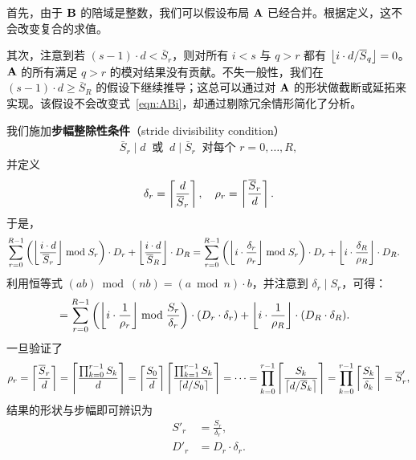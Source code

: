 首先，由于 $\mathbf{B}$ 的陪域是整数，我们可以假设布局 $\mathbf{A}$ 已经合并。根据定义，这不会改变复合的求值。

其次，注意到若 $(s-1) \cdot d < \bar{S}_r$，则对所有 $i < s$ 与 $q > r$ 都有 $\left\lfloor {i \cdot d / \overline{S}_q} \right\rfloor = 0$。$\mathbf{A}$ 的所有满足 $q > r$ 的模对结果没有贡献。不失一般性，我们在 $(s-1) \cdot d \geq \bar{S}_R$ 的假设下继续推导；这总可以通过对 $\mathbf{A}$ 的形状做截断或延拓来实现。该假设不会改变式~\eqref{eqn:ABi}，却通过剔除冗余情形简化了分析。

我们施加{\bf 步幅整除性条件}（stride divisibility condition）
\begin{align}
\bar{S}_r \mid d \ \text{ 或 } \ d \mid \bar{S}_r \ \text{ 对每个 } r = 0, \ldots, R,
\label{eqn:divis_stride}
\end{align}
并定义
\begin{align*}
\delta_r = \left\lceil {\frac{d}{\overline{S}_r}} \right\rceil, \quad \rho_r = \left\lceil {\frac{\overline{S}_r}{d}} \right\rceil.
\end{align*}
于是，
\begin{align*}
\sum_{r=0}^{R-1} \left(\left\lfloor {\frac{i \cdot d}{\overline{S}_r}} \right\rfloor \bmod S_r\right) \cdot D_r + \left\lfloor {\frac{i \cdot d}{\overline{S}_R}} \right\rfloor \cdot D_R &=
\sum_{r=0}^{R-1} \left(\left\lfloor {i \cdot \frac{\delta_r}{\rho_r}} \right\rfloor \bmod S_r\right) \cdot D_r + \left\lfloor {i \cdot \frac{\delta_R}{\rho_R}} \right\rfloor \cdot D_R.
\end{align*}
利用恒等式 $(a b) \bmod (n b) = (a \bmod n) \cdot b$，并注意到 $\delta_r \mid S_r$，可得：
\begin{align*}
&= \sum_{r=0}^{R-1} \left(\left\lfloor {i \cdot \frac{1}{\rho_r}} \right\rfloor \bmod \frac{S_r}{\delta_r}\right) \cdot (D_r \cdot \delta_r) + \left\lfloor {i \cdot \frac{1}{\rho_R}} \right\rfloor \cdot (D_R \cdot \delta_R).
\end{align*}
一旦验证了
\begin{align*}
\rho_r = \left\lceil {\frac{\overline{S}_r}{d}} \right\rceil = \left\lceil {\frac{\prod_{k=0}^{r-1} S_k}{d}} \right\rceil = \left\lceil {\frac{S_0}{d}} \right\rceil \left\lceil {\frac{\prod_{k=1}^{r-1} S_k}{\left\lceil {d / S_0} \right\rceil}} \right\rceil = \cdots = \prod_{k=0}^{r-1} \left\lceil {\frac{S_k}{\left\lceil {d / \overline{S}_k} \right\rceil}} \right\rceil = \prod_{k=0}^{r-1} \left\lceil {\frac{S_k}{\delta_k}} \right\rceil = \overline{S}'_r,
\end{align*}
结果的形状与步幅即可辨识为
\begin{align*}
S'_r &= \frac{S_r}{\delta_r}, \\
D'_r &= D_r \cdot \delta_r.
\end{align*}

